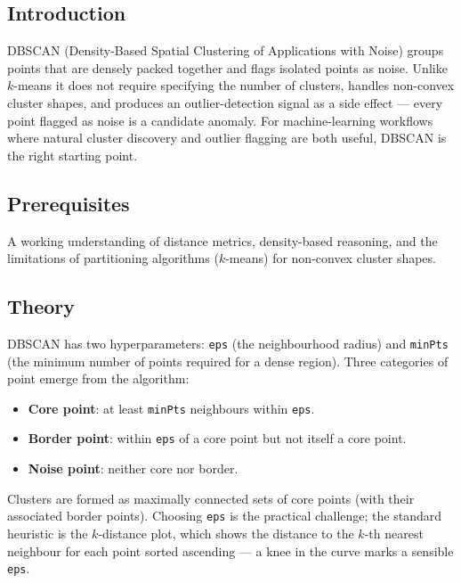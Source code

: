 \documentclass[
]{article}
\author{}
\date{\vspace{-2.5em}}
\providecommand{\tightlist}{%
  \setlength{\itemsep}{0pt}\setlength{\parskip}{0pt}}
\begin{document}
\subsection{Introduction}\label{introduction}

DBSCAN (Density-Based Spatial Clustering of Applications with Noise)
groups points that are densely packed together and flags isolated points
as noise. Unlike \(k\)-means it does not require specifying the number
of clusters, handles non-convex cluster shapes, and produces an
outlier-detection signal as a side effect --- every point flagged as
noise is a candidate anomaly. For machine-learning workflows where
natural cluster discovery and outlier flagging are both useful, DBSCAN
is the right starting point.

\subsection{Prerequisites}\label{prerequisites}

A working understanding of distance metrics, density-based reasoning,
and the limitations of partitioning algorithms (\(k\)-means) for
non-convex cluster shapes.

\subsection{Theory}\label{theory}

DBSCAN has two hyperparameters: \texttt{eps} (the neighbourhood radius)
and \texttt{minPts} (the minimum number of points required for a dense
region). Three categories of point emerge from the algorithm:

\begin{itemize}
\tightlist
\item
  \textbf{Core point}: at least \texttt{minPts} neighbours within
  \texttt{eps}.
\item
  \textbf{Border point}: within \texttt{eps} of a core point but not
  itself a core point.
\item
  \textbf{Noise point}: neither core nor border.
\end{itemize}

Clusters are formed as maximally connected sets of core points (with
their associated border points). Choosing \texttt{eps} is the practical
challenge; the standard heuristic is the \(k\)-distance plot, which
shows the distance to the \(k\)-th nearest neighbour for each point
sorted ascending --- a knee in the curve marks a sensible \texttt{eps}.
\end{document}
